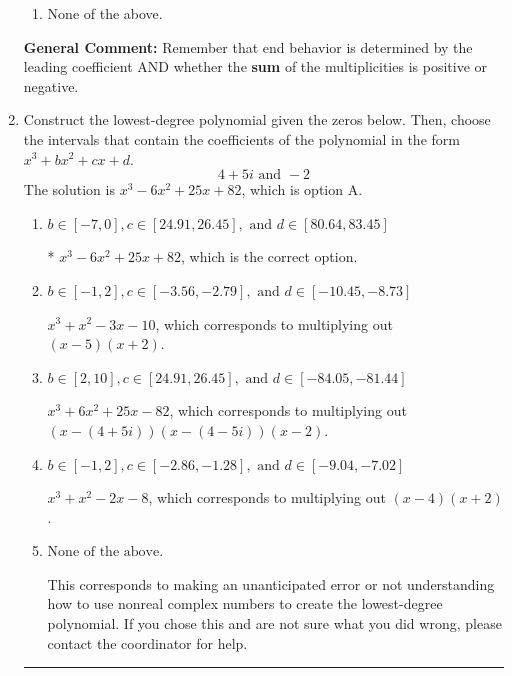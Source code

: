 \documentclass{extbook}[14pt]
\newcommand{\litem}[1]{\item #1

\rule{\textwidth}{0.4pt}}
\begin{document}
\begin{enumerate}
{\begin{enumerate}[label=\Alph*.]
\item None of the above.\end{enumerate}
\textbf{General Comment:} Remember that end behavior is determined by the leading coefficient AND whether the \textbf{sum} of the multiplicities is positive or negative.
}
\litem{
Construct the lowest-degree polynomial given the zeros below. Then, choose the intervals that contain the coefficients of the polynomial in the form $x^3+bx^2+cx+d$.
\[ 4 + 5 i \text{ and } -2 \]The solution is \( x^{3} -6 x^{2} +25 x + 82 \), which is option A.\begin{enumerate}[label=\Alph*.]
\item \( b \in [-7, 0], c \in [24.91, 26.45], \text{ and } d \in [80.64, 83.45] \)

* $x^{3} -6 x^{2} +25 x + 82$, which is the correct option.
\item \( b \in [-1, 2], c \in [-3.56, -2.79], \text{ and } d \in [-10.45, -8.73] \)

$x^{3} + x^{2} -3 x -10$, which corresponds to multiplying out $(x -5)(x + 2)$.
\item \( b \in [2, 10], c \in [24.91, 26.45], \text{ and } d \in [-84.05, -81.44] \)

$x^{3} +6 x^{2} +25 x -82$, which corresponds to multiplying out $(x-(4 + 5 i))(x-(4 - 5 i))(x -2)$.
\item \( b \in [-1, 2], c \in [-2.86, -1.28], \text{ and } d \in [-9.04, -7.02] \)

$x^{3} + x^{2} -2 x -8$, which corresponds to multiplying out $(x -4)(x + 2)$.
\item \( \text{None of the above.} \)

This corresponds to making an unanticipated error or not understanding how to use nonreal complex numbers to create the lowest-degree polynomial. If you chose this and are not sure what you did wrong, please contact the coordinator for help.
\end{enumerate}

}
\end{enumerate}
\end{document}
